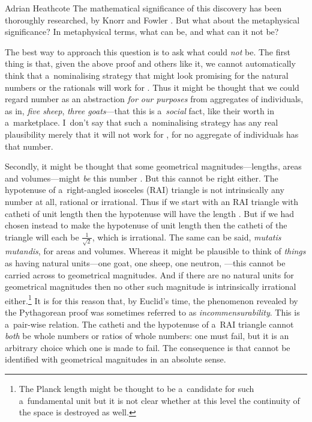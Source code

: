 \begin{artengenv}{Adrian Heathcote}
The mathematical significance of this discovery has been thoroughly researched, by Knorr \parencite*{knorr_evolution_1975} and Fowler \parencite*{fowler_mathematics_1999}. But what about the metaphysical significance? In metaphysical terms, what can \sqrtwo be, and what can it not be?

The best way to approach this question is to ask what \sqrtwo could \textit{not} be. The first thing is that, given the above proof and others like it, we cannot automatically think that a~nominalising strategy that might look promising for the natural numbers or the rationals will work for  \sqrtwo. Thus it might be thought that we could regard number as an abstraction \textit{for our purposes} from aggregates of individuals, as in, \textit{five sheep}, \textit{three goats}---that this is a~\textit{social} fact, like their worth in a~marketplace. I~don't say that such a~nominalising strategy has any real plausibility merely that it will not work for \sqrtwo, for no aggregate of individuals has that number. 

Secondly, it might be thought that some geometrical magnitudes---lengths, areas and volumes---might \textit{be} this number \sqrtwo. But this cannot be right either. The hypotenuse of a~right-angled isosceles (RAI) triangle is not intrinsically any number at all, rational or irrational. Thus if we start with an RAI triangle with catheti of unit length then the hypotenuse will have the length \sqrtwo. But if we had chosen instead to make the hypotenuse of unit length then the catheti of the triangle will each be $\frac{1}{\sqrt{2}}$, which is irrational. The same can be said, \textit{mutatis mutandis}, for areas and volumes. Whereas it might be plausible to think of \textit{things} as having natural units---one goat, one sheep, one neutron, \etc---this cannot be carried across to geometrical magnitudes. And if there are no natural units for geometrical magnitudes then no other such magnitude is intrinsically irrational either.\footnote{The Planck length might be thought to be a~candidate for such a~fundamental unit but it is not clear whether at this level the continuity of the space is destroyed as well.} It is for this reason that, by Euclid's time, the phenomenon revealed by the Pythagorean proof was sometimes referred to as \textit{incommensurability}. This is a~pair-wise relation. The catheti and the hypotenuse of a~RAI triangle cannot \textit{both} be whole numbers or ratios of whole numbers: one must fail, but it is an arbitrary choice which one is made to fail. The consequence is that \sqrtwo cannot be identified with geometrical magnitudes in an absolute sense.


\end{artengenv}

